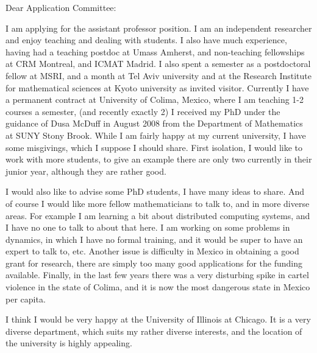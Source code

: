 \documentclass[12pt]{letter}
\date{Fall 2018}
\begin{document}
\begin{letter}{
}
\opening{Dear Application Committee:}   
I am applying for the assistant professor position. I am an independent researcher and enjoy teaching and dealing with students.
I also have much experience, having had a teaching postdoc at Umass Amherst, 
and non-teaching fellowships at CRM Montreal, and ICMAT Madrid. I also spent a semester as a postdoctoral fellow at MSRI, and a
month at Tel Aviv university and at the Research Institute for mathematical
sciences at Kyoto university as invited visitor. Currently I have a permanent contract at University of Colima,  Mexico, where I am teaching 1-2 courses a semester, (and recently exactly 2)
I received my PhD under the 
guidance of Dusa McDuff
in August 2008 from
the Department of Mathematics at SUNY Stony Brook.  While I am fairly happy at my current university,  
I have some misgivings, which I suppose I should share.
First isolation, I would like to work with more students, to give an example there are only two currently in their junior year, although they are rather good. 

I would also like to advise some PhD students, I have many ideas to share. And of course I would like more fellow mathematicians to talk to, and in more diverse areas. For example I am learning a bit about distributed computing systems, and I have no one to talk to about that here. I am working on some problems in dynamics, in which I have no formal training, and it would be super to have an expert to talk to, etc.
Another issue is difficulty in Mexico in obtaining a good grant for research, there are simply too many good applications for the funding available.
Finally, in the last few years there was a very disturbing spike in cartel violence in the state of Colima, and it is now the most dangerous state in Mexico per capita. 


I think I would be very happy at the University of Illinois at Chicago.  It is a very diverse department, 
which suits my rather diverse interests,  and the location of the university
is highly appealing. 





\end{letter}
\end{document}
